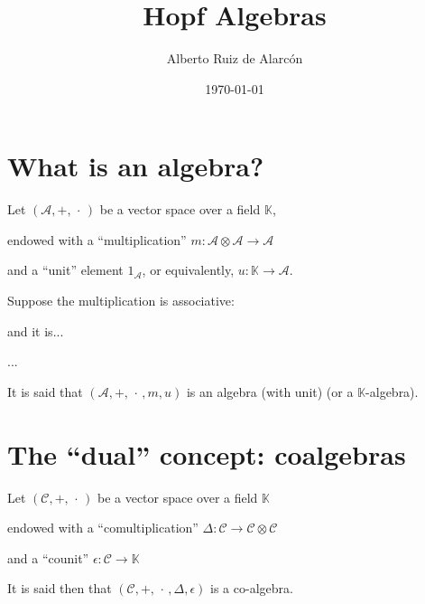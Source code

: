 \documentclass[12pt, a4paper, oneside]{amsproc}
\title{Hopf Algebras}
\author{Alberto Ruiz de Alarcón}
\date{\today}
\begin{document}
\maketitle

\section{What is an algebra?}

Let $(\mathcal A,+,\,\cdot\,)$ be a vector space over a field $\mathds K$,

endowed with a ``multiplication'' $m:\mathcal A\otimes \mathcal A \to \mathcal A$

and a ``unit'' element $1_{\mathcal A}$, or equivalently, $u:\mathds K\to \mathcal A$.

Suppose the multiplication is associative:

\begin{center}
\end{center}
and it is...
\begin{center}
...
\end{center}

It is  said that $(\mathcal A,+,\,\cdot\,,m,u)$ is an algebra (with unit) (or a $\mathds K$-algebra).
             
\section{The ``dual'' concept: coalgebras}

Let $(\mathcal C,+,\,\cdot\,)$ be a vector space over a field $\mathds K$

endowed with a ``comultiplication'' $\Delta:\mathcal C\to  \mathcal C\otimes \mathcal C$

and a ``counit'' $\epsilon:\mathcal C\to\mathds K$

It is said then that $(\mathcal C,+,\,\cdot\,,\Delta,\epsilon)$ is a co-algebra.
\end{document}
